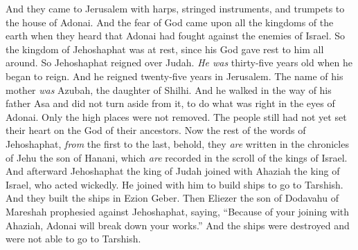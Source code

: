 \begin{biblechapter}
\verse And they came to Jerusalem with harps, stringed instruments, and trumpets to the house of Adonai.
\verse And the fear of God came upon all the kingdoms of the earth when they heard that Adonai had fought against the enemies of Israel.
\verse So the kingdom of Jehoshaphat was at rest, since his God gave rest to him all around.
 So Jehoshaphat reigned over Judah. \textit{He was} thirty-five years old when he began to reign. And he reigned twenty-five years in Jerusalem. The name of his mother \textit{was} Azubah, the daughter of Shilhi.
\verse And he walked in the way of his father Asa and did not turn aside from it, to do what was right in the eyes of Adonai.
\verse Only the high places were not removed. The people still had not yet set their heart on the God of their ancestors.
\verse Now the rest of the words of Jehoshaphat, \textit{from} the first to the last, behold, they \textit{are} written in the chronicles of Jehu the son of Hanani, which \textit{are} recorded in the scroll of the kings of Israel.
\verse And afterward Jehoshaphat the king of Judah joined with Ahaziah the king of Israel, who acted wickedly.
\verse He joined with him to build ships to go to Tarshish. And they built the ships in Ezion Geber.
\verse Then Eliezer the son of Dodavahu of Mareshah prophesied against Jehoshaphat, saying, “Because of your joining with Ahaziah, Adonai will break down your works.” And the ships were destroyed and were not able to go to Tarshish.
\end{biblechapter}

